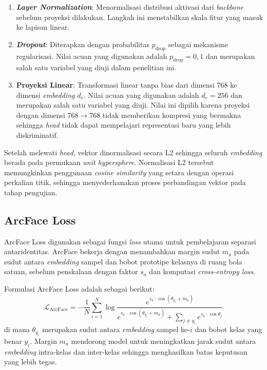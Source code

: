 \begin{enumerate}
    \item \textbf{\textit{Layer Normalization}}: Menormalisasi distribusi aktivasi dari \textit{backbone} sebelum proyeksi dilakukan. Langkah ini menstabilkan skala fitur yang masuk ke lapisan linear.
    \item \textbf{\textit{Dropout}}: Diterapkan dengan probabilitas $p_{\text{drop}}$ sebagai mekanisme regularisasi. Nilai acuan yang digunakan adalah $p_{\text{drop}} = 0{,}1$ dan merupakan salah satu variabel yang diuji dalam penelitian ini.
    \item \textbf{Proyeksi Linear}: Transformasi linear tanpa bias dari dimensi 768 ke dimensi \textit{embedding} $d_e$. Nilai acuan yang digunakan adalah $d_e = 256$ dan merupakan salah satu variabel yang diuji. Nilai ini dipilih karena proyeksi dengan dimensi 768$\rightarrow$768 tidak memberikan kompresi yang bermakna sehingga \textit{head} tidak dapat mempelajari representasi baru yang lebih diskriminatif.
\end{enumerate}

Setelah melewati \textit{head}, vektor dinormalisasi secara L2 sehingga seluruh \textit{embedding} berada pada permukaan \textit{unit hypersphere}. Normalisasi L2 tersebut memungkinkan penggunaan \textit{cosine similarity} yang setara dengan operasi perkalian titik, sehingga menyederhanakan proses perbandingan vektor pada tahap pengujian.

\subsection{ArcFace Loss}

ArcFace Loss digunakan sebagai fungsi \textit{loss} utama untuk pembelajaran separasi antaridentitas. ArcFace bekerja dengan menambahkan margin sudut $m_a$ pada sudut antara \textit{embedding} sampel dan bobot prototipe kelasnya di ruang bola satuan, sebelum penskalaan dengan faktor $s_a$ dan komputasi \textit{cross-entropy loss}.

Formulasi ArcFace Loss adalah sebagai berikut:
\begin{equation}
    \mathcal{L}_{\text{ArcFace}} = -\frac{1}{N} \sum_{i=1}^{N} \log \frac{e^{s_a \cdot \cos(\theta_{y_i} + m_a)}}{e^{s_a \cdot \cos(\theta_{y_i} + m_a)} + \sum_{j \neq y_i} e^{s_a \cdot \cos \theta_j}}
\end{equation}
di mana $\theta_{y_i}$ merupakan sudut antara \textit{embedding} sampel ke-$i$ dan bobot kelas yang benar $y_i$. Margin $m_a$ mendorong model untuk meningkatkan jarak sudut antara \textit{embedding} intra-kelas dan inter-kelas sehingga menghasilkan batas keputusan yang lebih tegas.

